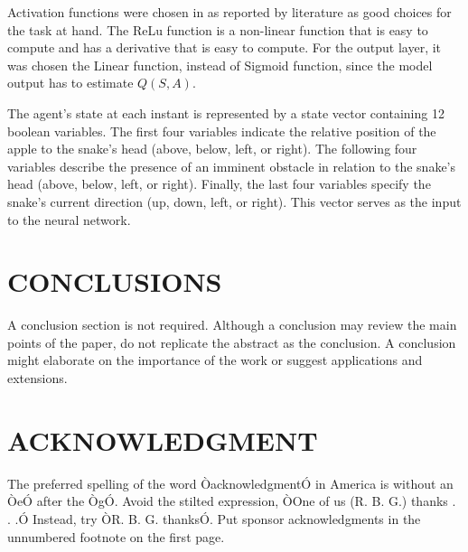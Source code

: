 \documentclass[conference]{IEEEtran}
\begin{document}
Activation functions were chosen in as reported by literature as good choices for the task at hand. The ReLu function is a non-linear function that is easy to compute and has a derivative that is easy to compute. For the output layer, it was chosen the Linear function, instead of Sigmoid function, since the model output has to estimate $Q(S,A)$.

The agent's state at each instant is represented by a state vector containing 12 boolean variables. The first four variables indicate the relative position of the apple to the snake's head (above, below, left, or right). The following four variables describe the presence of an imminent obstacle in relation to the snake's head (above, below, left, or right). Finally, the last four variables specify the snake's current direction (up, down, left, or right). This vector serves as the input to the neural network.


\section{CONCLUSIONS}

A conclusion section is not required. Although a conclusion may review the main points of the paper, do not replicate the abstract as the conclusion. A conclusion might elaborate on the importance of the work or suggest applications and extensions. 

\addtolength{\textheight}{-12cm}   %




\section*{ACKNOWLEDGMENT}

The preferred spelling of the word ÒacknowledgmentÓ in America is without an ÒeÓ after the ÒgÓ. Avoid the stilted expression, ÒOne of us (R. B. G.) thanks . . .Ó  Instead, try ÒR. B. G. thanksÓ. Put sponsor acknowledgments in the unnumbered footnote on the first page.
\end{document}
